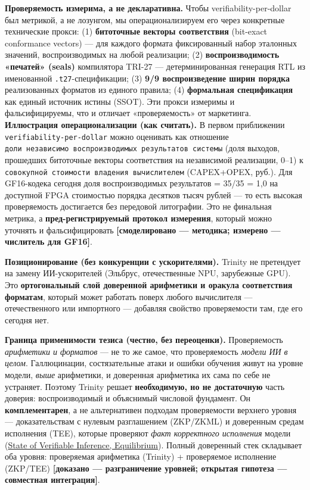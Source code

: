 \documentclass[
  russian,
]{article}
\begin{document}
\textbf{Проверяемость измерима, а не декларативна.} Чтобы
verifiability-per-dollar был метрикой, а не лозунгом, мы
операционализируем его через конкретные технические прокси: (1)
\textbf{битоточные векторы соответствия} (bit-exact conformance vectors)
--- для каждого формата фиксированный набор эталонных значений,
воспроизводимых на любой реализации; (2) \textbf{воспроизводимость
«печатей» (seals)} компилятора TRI-27 --- детерминированная генерация
RTL из именованной \texttt{.t27}-спецификации; (3) \textbf{9/9
воспроизведение ширин порядка} реализованных форматов из единого
правила; (4) \textbf{формальная спецификация} как единый источник истины
(SSOT). Эти прокси измеримы и фальсифицируемы, что и отличает
«проверяемость» от маркетинга. \textbf{Иллюстрация операционализации
(как считать).} В первом приближении \texttt{verifiability-per-dollar}
можно оценивать как отношение
\texttt{доли\ независимо\ воспроизводимых\ результатов\ системы} (доля
выходов, прошедших битоточные векторы соответствия на независимой
реализации, 0--1) к
\texttt{совокупной\ стоимости\ владения\ вычислителем} (CAPEX+OPEX,
руб.). Для GF16-кодека сегодня доля воспроизводимых результатов = 35/35
= 1,0 на доступной FPGA стоимостью порядка десятков тысяч рублей --- то
есть высокая проверяемость достигается без передовой литографии. Это не
финальная метрика, а \textbf{пред-регистрируемый протокол измерения},
который можно уточнять и фальсифицировать \textbf{{[}смоделировано ---
методика; измерено --- числитель для GF16{]}}.

\textbf{Позиционирование (без конкуренции с ускорителями).} Trinity не
претендует на замену ИИ-ускорителей (Эльбрус, отечественные NPU,
зарубежные GPU). Это \textbf{ортогональный слой доверенной арифметики и
оракула соответствия форматам}, который может работать поверх любого
вычислителя --- отечественного или импортного --- добавляя свойство
проверяемости там, где его сегодня нет.

\textbf{Граница применимости тезиса (честно, без переоценки).}
Проверяемость \emph{арифметики и форматов} --- не то же самое, что
проверяемость \emph{модели ИИ в целом}. Галлюцинации, состязательные
атаки и ошибки обучения живут на уровне модели, \emph{выше} арифметики,
и доверенная арифметика их сама по себе не устраняет. Поэтому Trinity
решает \textbf{необходимую, но не достаточную} часть доверия:
воспроизводимый и объяснимый числовой фундамент. Он
\textbf{комплементарен}, а не альтернативен подходам проверяемости
верхнего уровня --- доказательствам с нулевым разглашением (ZKP/ZKML) и
доверенным средам исполнения (TEE), которые проверяют \emph{факт
корректного исполнения} модели
(\href{https://equilibrium.co/writing/state-of-verifiable-inference}{State
of Verifiable Inference, Equilibrium}). Полный доверенный стек
складывает оба уровня: проверяемая арифметика (Trinity) + проверяемое
исполнение (ZKP/TEE) \textbf{{[}доказано --- разграничение уровней;
открытая гипотеза --- совместная интеграция{]}}.
\end{document}
